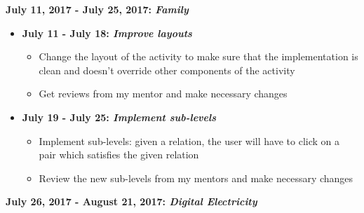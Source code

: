 \documentclass[preprint,12pt]{elsarticle}
\begin{document}
\textbf{July 11, 2017 - July 25, 2017: \textit{Family}}
\begin{itemize}

\item \textbf{July 11 - July 18: \textit{Improve layouts}}
\begin{itemize}
\item Change the layout of the activity to make sure that the implementation is clean and doesn't override other components of the activity
\item Get reviews from my mentor and make necessary changes
\end{itemize}

\item \textbf{July 19 - July 25: \textit{Implement sub-levels}}
\begin{itemize}
\item Implement sub-levels: given a relation, the user will have to click on a pair which satisfies the given relation
\item Review the new sub-levels from my mentors and make necessary changes
\end{itemize}

\end{itemize}

\textbf{July 26, 2017 - August 21, 2017: \textit{Digital Electricity}}
\end{document}
